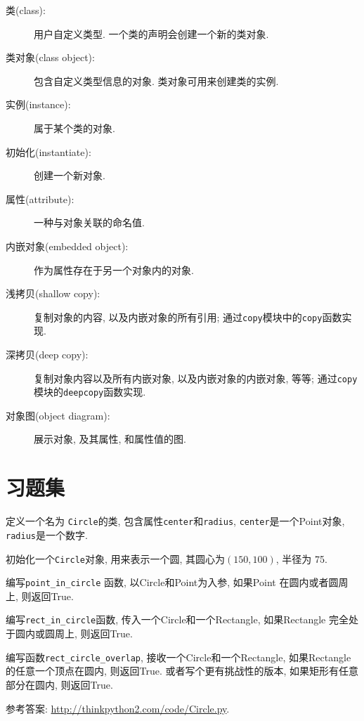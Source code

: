 \documentclass[10pt]{book}
\begin{document}
\begin{description}

\item[类(class):] 用户自定义类型. 一个类的声明会创建一个新的类对象. 

\item[类对象(class object):] 包含自定义类型信息的对象. 
类对象可用来创建类的实例. 

\item[实例(instance):] 属于某个类的对象. 

\item[初始化(instantiate):] 创建一个新对象.

\item[属性(attribute):] 一种与对象关联的命名值. 

\item[内嵌对象(embedded object):] 作为属性存在于另一个对象内的对象. 

\item[浅拷贝(shallow copy):] 复制对象的内容, 以及内嵌对象的所有引用;
通过{\tt copy}模块中的{\tt copy}函数实现. 

\item[深拷贝(deep copy):] 复制对象内容以及所有内嵌对象, 以及内嵌对象的内嵌对象, 等等;
通过{\tt copy} 模块的{\tt deepcopy}函数实现. 

\item[对象图(object diagram):] 展示对象, 及其属性, 和属性值的图. 

\end{description}


\section{习题集}

\begin{exercise}

定义一个名为 {\tt Circle}的类, 包含属性{\tt center}和{\tt radius}, 
 {\tt center}是一个Point对象, {\tt radius}是一个数字. 

初始化一个{\tt Circle}对象, 用来表示一个圆, 其圆心为$(150, 100)$, 
半径为 75.

编写\verb"point_in_circle" 函数, 以Circle和Point为入参, 
如果Point 在圆内或者圆周上, 则返回True. 

编写\verb"rect_in_circle"函数, 传入一个Circle和一个Rectangle, 
如果Rectangle 完全处于圆内或圆周上, 则返回True. 

编写函数\verb"rect_circle_overlap", 接收一个Circle和一个Rectangle, 
如果Rectangle的任意一个顶点在圆内, 则返回True. 
或者写个更有挑战性的版本, 如果矩形有任意部分在圆内, 则返回True. 

参考答案: \url{http://thinkpython2.com/code/Circle.py}.

\end{exercise}
\end{document}
